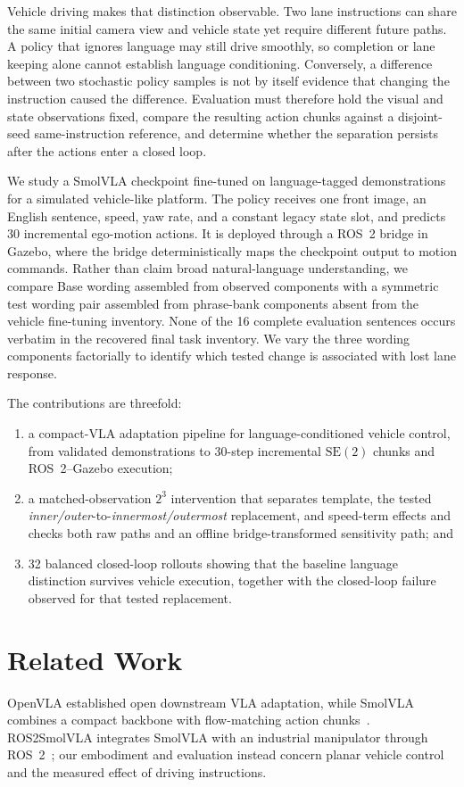 \documentclass[letterpaper,conference]{IEEEtran}
\newcommand{\seTwo}{\mathrm{SE}(2)}
\begin{document}
Vehicle driving makes that distinction observable. Two lane instructions can
share the same initial camera view and vehicle state yet require different
future paths. A policy that ignores language may still drive smoothly, so
completion or lane keeping alone cannot establish language conditioning.
Conversely, a difference between two stochastic policy samples is not by itself
evidence that changing the instruction caused the difference. Evaluation must
therefore hold the visual and state observations fixed, compare the resulting
action chunks against a disjoint-seed same-instruction reference, and determine
whether the separation persists after the actions enter a closed loop.

We study a SmolVLA checkpoint fine-tuned on language-tagged demonstrations for
a simulated vehicle-like platform. The policy receives one front image, an
English sentence, speed, yaw rate, and a constant legacy state slot, and
predicts 30 incremental ego-motion actions. It is deployed through a ROS~2 bridge in
Gazebo, where the bridge deterministically maps the checkpoint output to motion
commands. Rather than claim broad natural-language understanding, we compare
Base wording assembled from observed components with a symmetric test wording
pair assembled from phrase-bank components absent from the vehicle fine-tuning
inventory. None of the 16 complete evaluation sentences occurs verbatim in the
recovered final task inventory. We vary the three wording components
factorially to identify which tested change is associated with lost lane response.

The contributions are threefold:
\begin{enumerate}
    \item a compact-VLA adaptation pipeline for language-conditioned vehicle
    control, from validated demonstrations to 30-step incremental $\seTwo$
    chunks and ROS~2--Gazebo execution;
    \item a matched-observation $2^3$ intervention that separates template,
    the tested \emph{inner/outer}-to-\emph{innermost/outermost} replacement,
    and speed-term effects and checks both raw paths and an offline
    bridge-transformed sensitivity path; and
    \item 32 balanced closed-loop rollouts showing that the baseline language
    distinction survives vehicle execution, together with the closed-loop
    failure observed for that tested replacement.
\end{enumerate}

\section{Related Work}
OpenVLA established open downstream VLA adaptation, while SmolVLA combines a
compact backbone with flow-matching action chunks~\cite{openvla,smolvla}.
ROS2SmolVLA integrates SmolVLA with an industrial manipulator through
ROS~2~\cite{ros2smolvla}; our embodiment and evaluation instead concern planar
vehicle control and the measured effect of driving instructions.
\end{document}
